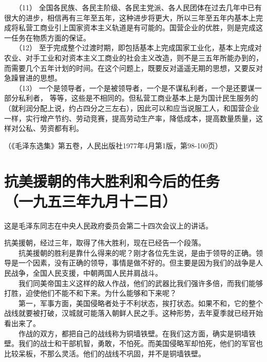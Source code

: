 \documentclass[cn,11pt,chinese]{elegantbook}
\def\myformat#1{\hfil\hfil #1}
\begin{document}
　　（11） 全国各民族、各民主阶级、各民主党派、各人民团体在过去几年中已有很大的进步，相信再有三年至五年，这种进步将更大，所以三年至五年内基本上完成将私营工商业引上国家资本主义轨道是有可能的。国营企业的优胜，则是完成这一任务在物质方面的保证。\\
　　（12） 至于完成整个过渡时期，即包括基本上完成国家工业化，基本上完成对农业、对手工业和对资本主义工商业的社会主义改造，则不是三五年所能办到的，而需要几个五年计划的时间。在这个问题上，既要反对遥遥无期的思想，又要反对急躁冒进的思想。\\
　　（13） 一个是领导者，一个是被领导者，一个是不谋私利者，一个是还要谋一部分私利者， 等等，这些是不相同的。但私营工商业基本上是为国计民生服务的（就利润分配上说，约占四分之三左右），因此可以和应当说服工人，和国营企业一样，实行增产节约、劳动竞赛，提高劳动生产率，降低成本，提高数量质量，这样对公私、劳资都有利。\\
\begin{flushright}（《毛泽东选集》第五卷，人民出版社1977年4月第1版，第98-100页）\end{flushright}
\newpage\section*{\myformat{抗美援朝的伟大胜利和今后的任务}\\\myformat{（一九五三年九月十二日）}}
\begin{introduction}\item  这是毛泽东同志在中央人民政府委员会第二十四次会议上的讲话。\end{introduction}
抗美援朝，经过三年，取得了伟大胜利，现在已经告一个段落。\\
　　抗美援朝的胜利是靠什么得来的呢？刚才各位先生说，是由于领导的正确。领导是一个因素，没有正确的领导，事情是做不好的。但主要是因为我们的战争是人民战争，全国人民支援，中朝两国人民并肩战斗。\\
　　我们同美帝国主义这样的敌人作战，他们的武器比我们强许多倍，而我们能够打胜，迫使他们不能不和下来。为什么能够和下来呢？\\
　　第一，军事方面，美国侵略者处于不利状态，挨打状态。如果不和，它的整个战线就要被打破，汉城就可能落入朝鲜人民之手。这种形势，去年夏季就已经开始看出来了。\\
　　作战的双方，都把自己的战线称为铜墙铁壁。在我们这方面，确实是铜墙铁壁。我们的战士和干部机智，勇敢，不怕死。而美国侵略军却怕死，他们的军官也比较呆板，不那么灵活。他们的战线不巩固，并不是铜墙铁壁。\\
\end{document}
